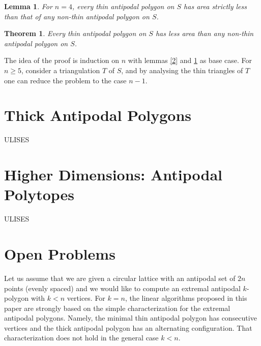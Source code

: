 \documentclass[twoside]{article}
\newtheorem{lem}[defin]{Lemma}
\newtheorem{thm}[defin]{Theorem}
\begin{document}
\begin{lem}\label{3}
For $n = 4$, every thin antipodal polygon on $S$ has area strictly less than
that of any non-thin antipodal polygon on $S$.
\end{lem}


\begin{thm}
Every thin antipodal polygon on $S$ has less area than any non-thin antipodal
polygon on $S$.
\end{thm}

The idea of the proof is induction on $n$ with lemmas \ref{2} and \ref{3} as base case. For $n\geq 5$, consider a triangulation $T$ of $S$, and by analysing the thin triangles of $T$ one can reduce the problem to the case $n-1$. 


\section{Thick Antipodal Polygons}
ULISES

\section{Higher Dimensions: Antipodal Polytopes}
ULISES


 \section{Open Problems}
 
Let us assume that we are given a circular lattice with an antipodal set of $2n$ points
(evenly spaced) and we would like to compute an extremal antipodal $k$-polygon with
$k < n$ vertices. For $k = n$, the linear algorithms proposed in this paper are strongly based on
the simple characterization for the extremal antipodal polygons. Namely, the minimal
thin antipodal polygon has consecutive vertices and the thick antipodal polygon has
an alternating configuration. That
characterization does not hold in the general case $k < n$.
\end{document}
